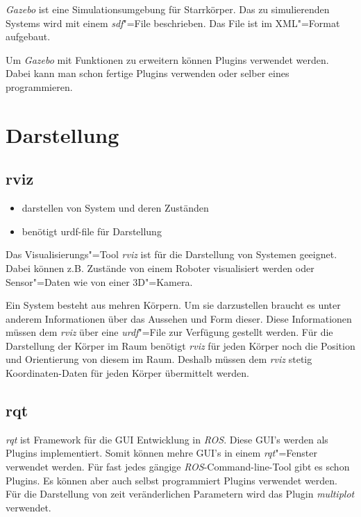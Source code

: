 \textit{Gazebo} ist eine Simulationsumgebung für Starrkörper.
Das zu simulierenden Systems wird mit einem \textit{sdf}"=File beschrieben. %
Das File ist im XML"=Format aufgebaut.

Um \textit{Gazebo} mit Funktionen zu erweitern können Plugins verwendet werden.
Dabei kann man schon fertige Plugins verwenden oder selber eines programmieren. %

\section{Darstellung}
\subsection{rviz}
\begin{itemize}
\item darstellen von System und deren Zuständen
\item benötigt urdf-file für Darstellung
\end{itemize}
Das Visualisierungs"=Tool \textit{rviz} ist für die Darstellung von Systemen geeignet.
Dabei können z.B. Zustände von einem Roboter visualisiert werden oder Sensor"=Daten wie von einer 3D"=Kamera.

Ein System besteht aus mehren Körpern.
Um sie darzustellen braucht es unter anderem Informationen über das Aussehen und Form dieser.
Diese Informationen müssen dem \textit{rviz} über eine \textit{urdf}"=File zur Verfügung gestellt werden. %
Für die Darstellung der Körper im Raum benötigt \textit{rviz} für jeden Körper noch die Position und Orientierung von diesem im Raum.
Deshalb müssen dem \textit{rviz} stetig Koordinaten-Daten für jeden Körper übermittelt werden. %

\subsection{rqt}
\textit{rqt} ist Framework für die GUI Entwicklung in \textit{ROS}.
Diese GUI's werden als Plugins implementiert.
Somit können mehre GUI's in einem \textit{rqt}"=Fenster verwendet werden.
Für fast jedes gängige \textit{ROS}-Command-line-Tool gibt es schon Plugins. %
Es können aber auch selbst programmiert Plugins verwendet werden. 
Für die Darstellung von zeit veränderlichen Parametern wird das Plugin \textit{multiplot} verwendet. %



